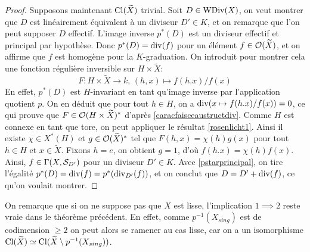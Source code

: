 \begin{proof}
Supposons maintenant $\operatorname{Cl}(\widetilde{X})$ trivial. Soit $D\in\operatorname{WDiv}(X)$, on veut montrer que $D$ est linéairement équivalent à un diviseur $D'\in K$, et on remarque que l'on peut supposer $D$ effectif. L'image inverse $p^*(D)$ est un diviseur effectif et principal par hypothèse. Donc $p^*(D)=\operatorname{div}(f)$ pour un élément $f\in \mathcal{O}(\widetilde{X})$, et on affirme que $f$ est homogène pour la $K$-graduation. On introduit pour montrer cela une fonction régulière inversible sur $H\times \widetilde{X}$:
$$F:H\times \widetilde{X}\rightarrow k,\,(h,x)\mapsto f(h.x)/f(x)$$
En effet, $p^*(D)$ est $H$-invariant en tant qu'image inverse par l'application quotient $p$. On en déduit que pour tout $h\in H$, on a $\operatorname{div}(x\mapsto f(h.x)/f(x))=0$, ce qui prouve que $F\in \mathcal{O}(H\times \widetilde{X})^*$ d'après \ref{caracfaisceaustructdiv}. Comme $H$ est connexe en tant que tore, on peut appliquer le résultat \ref{rosenlicht1}. Ainsi il existe $\chi \in X^*(H)$ et $g\in\mathcal{O}(\widetilde{X})^*$ tel que $F(h,x)=\chi(h)g(x)$ pour tout $h\in H$ et $x\in \widetilde{X}$. Fixons $h=e$, on obtient $g=1$, d'où $f(h.x)=\chi(h)f(x)$. Ainsi, $f\in \Gamma(X, \mathcal{S}_{D'})$ pour un diviseur $D'\in K$. Avec \ref{pstarprincipal}, on tire l'égalité $p^*(D)=\operatorname{div}(f)=p^*(\operatorname{div}_{D'}(f))$, et on conclut que $D=D'+\operatorname{div}(f)$, ce qu'on voulait montrer.
\end{proof}

\begin{rem}
On remarque que si on ne suppose pas que $X$ est lisse, l'implication $1\implies 2$ reste vraie dans le théorème précédent. En effet, comme $p^{-1}(X_{sing})$ est de codimension $\geq 2$ on peut alors se ramener au cas lisse, car on a un isomorphisme $\operatorname{Cl}(\widetilde{X})\simeq\operatorname{Cl}(\widetilde{X}\setminus p^{-1}(X_{sing}))$. 
\end{rem}


